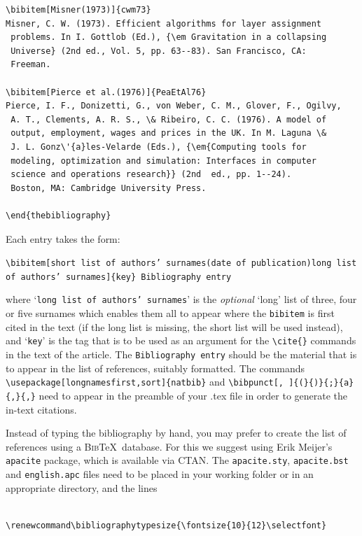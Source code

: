 \documentclass{nCSE2e}
\begin{document}
\begin{verbatim}
\bibitem[Misner(1973)]{cwm73}
Misner, C. W. (1973). Efficient algorithms for layer assignment
 problems. In I. Gottlob (Ed.), {\em Gravitation in a collapsing
 Universe} (2nd ed., Vol. 5, pp. 63--83). San Francisco, CA:
 Freeman.

\bibitem[Pierce et al.(1976)]{PeaEtAl76}
Pierce, I. F., Donizetti, G., von Weber, C. M., Glover, F., Ogilvy,
 A. T., Clements, A. R. S., \& Ribeiro, C. C. (1976). A model of
 output, employment, wages and prices in the UK. In M. Laguna \&
 J. L. Gonz\'{a}les-Velarde (Eds.), {\em{Computing tools for
 modeling, optimization and simulation: Interfaces in computer
 science and operations research}} (2nd  ed., pp. 1--24).
 Boston, MA: Cambridge University Press.

\end{thebibliography}
\end{verbatim}
\medskip
\noindent Each entry takes the form: \vspace{12pt}

\noindent\verb"\bibitem"{\tt{[short list of authors' surnames(date of publication)long list of authors' surnames]\{key\} Bibliography entry}}
\vspace{12pt}

\noindent where `\texttt{long list of authors' surnames}' is the \emph{optional} `long' list of three, four or five surnames which enables them all to appear where the \verb"bibitem" is first cited in the text (if the long list is missing, the short list will be used instead), and `{\tt key}' is the tag that is to be used as an argument for the \verb"\cite{}" commands in the text of the article. The {\tt Bibliography entry} should be the material that is to appear in the list of references, suitably formatted. The commands \verb"\usepackage[longnamesfirst,sort]{natbib}" and \verb"\bibpunct[, ]{(}{)}{;}{a}{,}{,}" need to appear in the preamble of your .tex file in order to generate the in-text citations.

Instead of typing the bibliography by hand, you may prefer to create the list of references using a \textsc{Bib}\TeX\ database. For this we suggest using Erik Meijer's \texttt{apacite} package, which is available via CTAN. The \verb"apacite.sty", \verb"apacite.bst" and \verb"english.apc" files need to be placed in your working folder or in an appropriate directory, and the lines

\begin{verbatim}

\renewcommand\bibliographytypesize{\fontsize{10}{12}\selectfont}

\end{verbatim}
\end{document}
